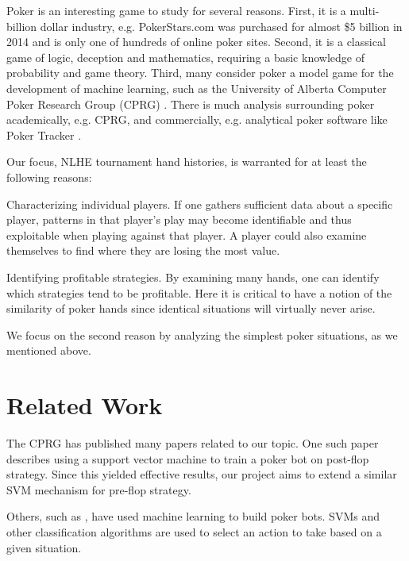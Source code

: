 \documentclass[twoside]{article}
\begin{document}
\begin{multicols}{2}
Poker is an interesting game to study for several reasons. First, it is a multi-billion dollar industry, e.g. PokerStars.com was purchased for almost \$5 billion in 2014 \cite{PokerStarsAcquired} and is only one of hundreds of online poker sites. Second, it is a classical game of logic, deception and mathematics, requiring a basic knowledge of probability and game theory. Third, many consider poker a model game for the development of machine learning, such as the University of Alberta Computer Poker Research Group (CPRG) \cite{SVMPoker}. There is much analysis surrounding poker academically, e.g. CPRG, and commercially, e.g. analytical poker software like Poker Tracker \cite{PokerTracker}.

Our focus, NLHE tournament hand histories, is warranted for at least the following reasons:

\begin{compactitem}
	\item Characterizing individual players. If one gathers sufficient data about a specific player, patterns in that player's play may become identifiable and thus exploitable when playing against that player. A player could also examine themselves to find where they are losing the most value.
	\item Identifying profitable strategies. By examining many hands, one can identify which strategies tend to be profitable. Here it is critical to have a notion of the similarity of poker hands since identical situations will virtually never arise.
\end{compactitem}

We focus on the second reason by analyzing the simplest poker situations, as we mentioned above. 


\section{Related Work}

The CPRG has published many papers related to our topic.
One such paper \cite{SVMPoker} describes using a support vector machine to train a poker bot on post-flop strategy. Since this yielded effective results, our project aims to extend a similar SVM mechanism for pre-flop strategy.

Others, such as \cite{holdemml}, have used machine learning to build poker bots. SVMs and other classification algorithms are used to select an action to take based on a given situation.


\end{multicols}
\end{document}
